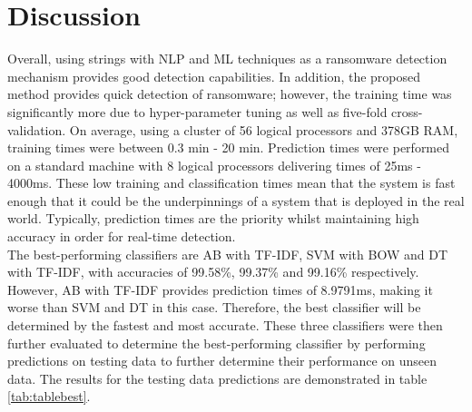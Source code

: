 \documentclass[conference]{IEEEtran}
\begin{document}
\section{Discussion}
Overall, using strings with NLP and ML techniques as a ransomware detection mechanism provides good detection capabilities. In addition, the proposed method provides quick detection of ransomware; however, the training time was significantly more due to hyper-parameter tuning as well as five-fold cross-validation. On average, using a cluster of 56 logical processors and 378GB RAM, training times were between 0.3 min - 20 min. Prediction times were performed on a standard machine with 8 logical processors delivering times of 25ms - 4000ms. These low training and classification times mean that the system is fast enough that it could be the underpinnings of a system that is deployed in the real world. Typically, prediction times are the priority whilst maintaining high accuracy in order for real-time detection. \\

The best-performing classifiers are AB with TF-IDF, SVM with BOW and DT with TF-IDF, with accuracies of 99.58\%, 99.37\% and 99.16\% respectively. However, AB with TF-IDF provides prediction times of 8.9791ms, making it worse than SVM and DT in this case. Therefore, the best classifier will be determined by the fastest and most accurate. These three classifiers were then further evaluated to determine the best-performing classifier by performing predictions on testing data to further determine their performance on unseen data. 
The results for the testing data predictions are demonstrated in table \ref{tab:tablebest}.

\begin{table}[h!]
\caption{\label{tab:tablebest} Testing Data Predictions Of The Three Best Performing Classifiers.}
\end{table}
  
\end{document}
